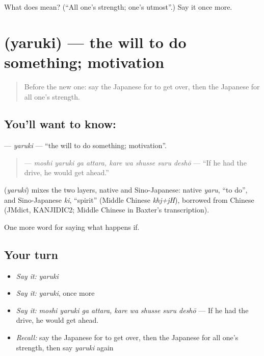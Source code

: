 \begin{tcolorbox}[breakable,colback=teal!4,colframe=teal!35!black,title={Before you move on}]
What does  mean? (\textquotedblleft{}All one's strength; one's utmost\textquotedblright{}.) Say it once more.
\end{tcolorbox}
\section[\texorpdfstring{\ja{やるき} (yaruki)}{やるき (yaruki)}]{ (yaruki) — the will to do something; motivation}

\label{lesson:JA-C516-yaruki}



\begin{quote}
Before the new one: say the Japanese for to get over, then the Japanese for all one's strength.
\end{quote}

\subsection*{You'll want to know: }
\textbf{} — \emph{yaruki} — \textquotedblleft{}the will to do something; motivation\textquotedblright{}.

\begin{quote}
\textbf{   } — \emph{moshi yaruki ga attara, kare wa shusse suru deshō} — \textquotedblleft{}If he had the drive, he would get ahead.\textquotedblright{}
\end{quote}

\begin{cousinweb}
\textbf{} (\emph{yaruki}) mixes the two layers, native and Sino-Japanese: native \emph{yaru}, \textquotedblleft{}to do\textquotedblright{}, and Sino-Japanese \emph{ki}, \textquotedblleft{}spirit\textquotedblright{} (Middle Chinese \emph{khj+jH}), borrowed from Chinese (JMdict, KANJIDIC2; Middle Chinese in Baxter's transcription).
\end{cousinweb}

\begin{grammarlens}[title={What you've built}]
One more word for saying what happens if.
\end{grammarlens}

\subsection*{Your turn}
\begin{itemize}
\raggedright
  \item \emph{Say it:} \emph{yaruki}
  \item \emph{Say it:} \emph{yaruki}, once more
  \item \emph{Say it:} \emph{moshi yaruki ga attara, kare wa shusse suru deshō} — If he had the drive, he would get ahead.
  \item \emph{Recall:} say the Japanese for to get over, then the Japanese for all one's strength, then say \emph{yaruki} again
\end{itemize}

